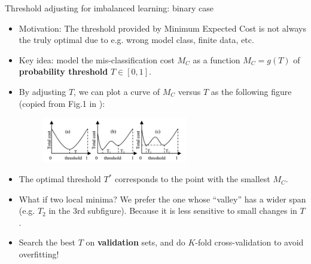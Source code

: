 \documentclass[11pt,compress,t,notes=noshow, xcolor=table]{beamer}
\begin{document}
\begin{vbframe}{Threshold adjusting for imbalanced learning: binary case}
    \footnotesize 
    \begin{itemize}
        \footnotesize
        \item Motivation: The threshold provided by Minimum Expected Cost is not always the truly optimal due to e.g. wrong model class, finite data, etc.
        \item Key idea: model the mis-classification cost $M_C$ as a function $M_C = g(T)$ of \textbf{probability threshold} $T \in [0, 1]$.
        \item By adjusting $T$, we can plot a curve of $M_C$ versus $T$ as the following figure (copied from Fig.1 in \href{https://www.aaai.org/Library/AAAI/2006/aaai06-076.php}{}):
        \begin{figure}[h]
            \centering
            \includegraphics[width=0.6\textwidth]{slides/imbalanced-learning/figure/threshold_adjusting.png}
        \end{figure}

        \item The optimal threshold $T^{*}$ corresponds to the point with the smallest $M_C$.

        \item What if two local minima? We prefer the one whose ``valley'' has a wider span (e.g. $T_2$ in the 3rd subfigure). Because it is less sensitive to small changes in $T$.

        \item Search the best $T$ on \textbf{validation} sets, and do $K$-fold cross-validation to avoid overfitting!
    \end{itemize}
\end{vbframe}
\end{document}

